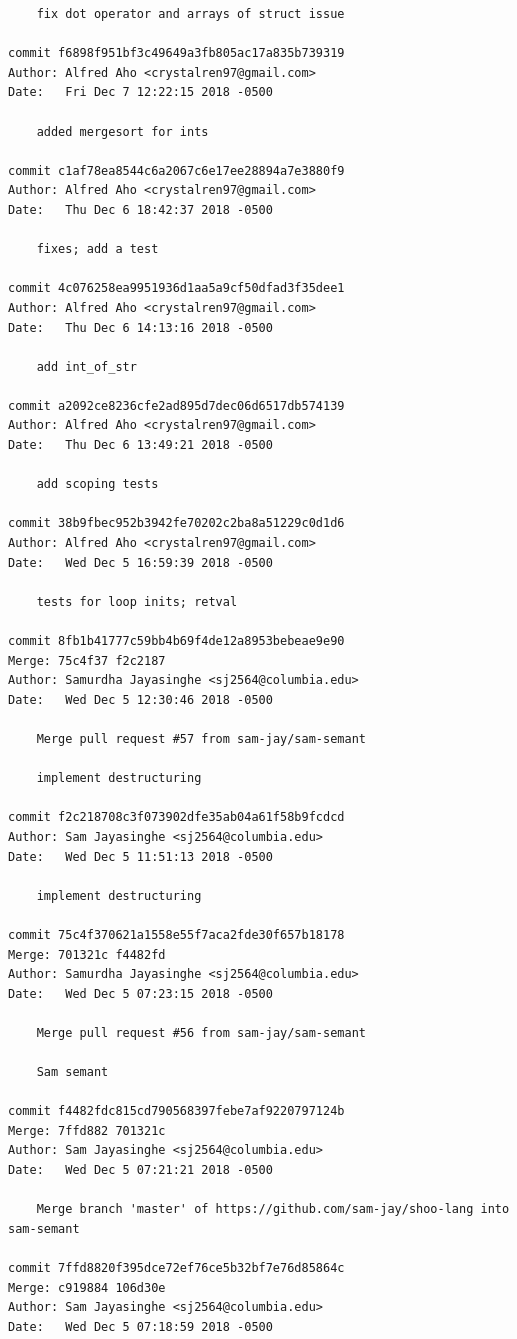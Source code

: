 \documentclass[12pt]{article}
\begin{document}
\begin{lstlisting}
    fix dot operator and arrays of struct issue

commit f6898f951bf3c49649a3fb805ac17a835b739319
Author: Alfred Aho <crystalren97@gmail.com>
Date:   Fri Dec 7 12:22:15 2018 -0500

    added mergesort for ints

commit c1af78ea8544c6a2067c6e17ee28894a7e3880f9
Author: Alfred Aho <crystalren97@gmail.com>
Date:   Thu Dec 6 18:42:37 2018 -0500

    fixes; add a test

commit 4c076258ea9951936d1aa5a9cf50dfad3f35dee1
Author: Alfred Aho <crystalren97@gmail.com>
Date:   Thu Dec 6 14:13:16 2018 -0500

    add int_of_str

commit a2092ce8236cfe2ad895d7dec06d6517db574139
Author: Alfred Aho <crystalren97@gmail.com>
Date:   Thu Dec 6 13:49:21 2018 -0500

    add scoping tests

commit 38b9fbec952b3942fe70202c2ba8a51229c0d1d6
Author: Alfred Aho <crystalren97@gmail.com>
Date:   Wed Dec 5 16:59:39 2018 -0500

    tests for loop inits; retval

commit 8fb1b41777c59bb4b69f4de12a8953bebeae9e90
Merge: 75c4f37 f2c2187
Author: Samurdha Jayasinghe <sj2564@columbia.edu>
Date:   Wed Dec 5 12:30:46 2018 -0500

    Merge pull request #57 from sam-jay/sam-semant
    
    implement destructuring

commit f2c218708c3f073902dfe35ab04a61f58b9fcdcd
Author: Sam Jayasinghe <sj2564@columbia.edu>
Date:   Wed Dec 5 11:51:13 2018 -0500

    implement destructuring

commit 75c4f370621a1558e55f7aca2fde30f657b18178
Merge: 701321c f4482fd
Author: Samurdha Jayasinghe <sj2564@columbia.edu>
Date:   Wed Dec 5 07:23:15 2018 -0500

    Merge pull request #56 from sam-jay/sam-semant
    
    Sam semant

commit f4482fdc815cd790568397febe7af9220797124b
Merge: 7ffd882 701321c
Author: Sam Jayasinghe <sj2564@columbia.edu>
Date:   Wed Dec 5 07:21:21 2018 -0500

    Merge branch 'master' of https://github.com/sam-jay/shoo-lang into sam-semant

commit 7ffd8820f395dce72ef76ce5b32bf7e76d85864c
Merge: c919884 106d30e
Author: Sam Jayasinghe <sj2564@columbia.edu>
Date:   Wed Dec 5 07:18:59 2018 -0500


\end{lstlisting}
\end{document}
